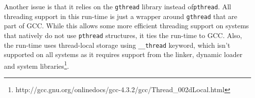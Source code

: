 Another issue is that it relies on the \verb=gthread= library instead of\verb=pthread=. All threading support in this run-time is just a wrapper around \verb=gthread= that are part of GCC. While this allows some more efficient threading support on systems that natively do not use \verb=pthread= structures, it ties the run-time to GCC. Also, the run-time uses thread-local storage using \verb=__thread= keyword, which isn't supported on all systems as it requires support from the linker, dynamic loader and system libraries\footnote{http://gcc.gnu.org/onlinedocs/gcc-4.3.2/gcc/Thread\_002dLocal.html}.